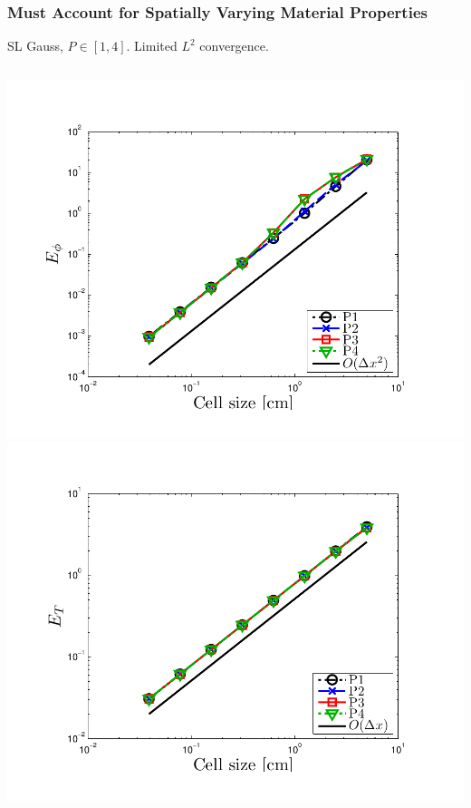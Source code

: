 \documentclass{beamer}
\begin{document}
\begin{frame}
\frametitle{Must Account for Spatially Varying Material Properties}
SL Gauss, $P\in[1,4]$.  Limited $L^2$ convergence.
\begin{columns}[t]
\centering
\includegraphics[width=\textwidth,trim=0.25in  0.2in 0.75in 0.5in,clip=true]{../chapter6_grey_radtran/Dissertation_Data/MMS3_Constant_XS_SL_Gauss_phi_L2.pdf}
\centering
\includegraphics[width=\textwidth,trim=0.25in  0.2in 0.75in 0.5in,clip=true]{../chapter6_grey_radtran/Dissertation_Data/MMS3_Constant_XS_SL_Gauss_temp_L2.pdf}
\end{columns}
\end{frame}
\end{document}
